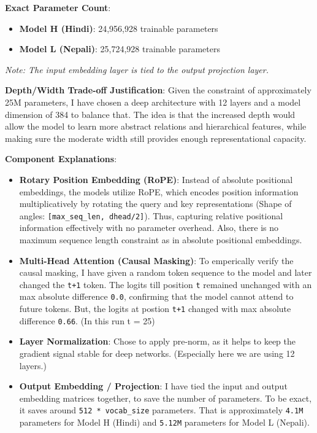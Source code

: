 \documentclass[10pt,a4paper]{article}
\begin{document}
\textbf{Exact Parameter Count}:
\begin{itemize}
\item \textbf{Model H (Hindi)}: 24,956,928 trainable parameters
\item \textbf{Model L (Nepali)}: 25,724,928 trainable parameters
\end{itemize}

\emph{Note: The input embedding layer is tied to the output projection layer.}

\textbf{Depth/Width Trade-off Justification}:
Given the constraint of approximately 25M parameters, I have chosen a deep architecture with 12 layers and a model dimension of 384 to balance that. The idea is that the increased depth would allow the model to learn more abstract relations and hierarchical features, while making sure the moderate width still provides enough representational capacity.

\textbf{Component Explanations}:
\begin{itemize}
\item \textbf{Rotary Position Embedding (RoPE)}: Instead of absolute positional embeddings, the models utilize RoPE, which encodes position information multiplicatively by rotating the query and key representations (Shape of angles: \texttt{[max\_seq\_len, dhead/2]}). Thus, capturing relative positional information effectively with no parameter overhead. Also, there is no maximum sequence length constraint as in absolute positional embeddings.
\item \textbf{Multi-Head Attention (Causal Masking)}: To emperically verify the causal masking, I have given a random token sequence to the model and later changed the \texttt{t+1} token. The logits till position \texttt{t} remained unchanged with an max absolute difference \texttt{0.0}, confirming that the model cannot attend to future tokens. But, the logits at postion \texttt{t+1} changed with max absolute difference \texttt{0.66}. (In this run t = 25)
\item \textbf{Layer Normalization}: Chose to apply pre-norm, as it helps to keep the gradient signal stable for deep networks. (Especially here we are using 12 layers.)
\item \textbf{Output Embedding / Projection}: I have tied the input and output embedding matrices together, to save the number of parameters. To be exact, it saves around \texttt{512 * vocab\_size} parameters. That is approximately \texttt{4.1M} parameters for Model H (Hindi) and \texttt{5.12M} parameters for Model L (Nepali).
\end{itemize}
\end{document}
